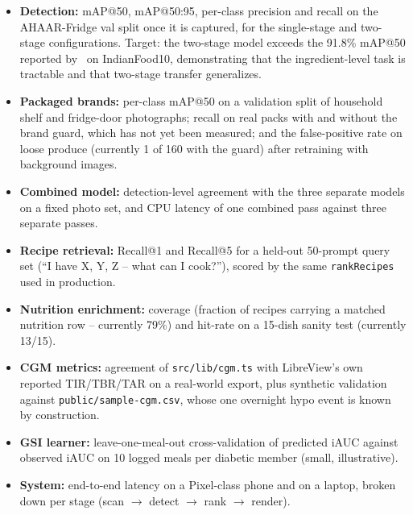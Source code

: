 \documentclass[journal]{IEEEtran}
\begin{document}
\begin{itemize}
  \item \textbf{Detection:} mAP@50, mAP@50:95, per-class precision
        and recall on the AHAAR-Fridge val split once it is captured,
        for the single-stage and two-stage configurations. Target: the two-stage model exceeds the
        91.8\% mAP@50 reported by~\cite{indianfood10} on
        IndianFood10, demonstrating that the ingredient-level task
        is tractable and that two-stage transfer generalizes.
  \item \textbf{Packaged brands:} per-class mAP@50 on a validation
        split of household shelf and fridge-door photographs; recall
        on real packs with and without the brand guard, which has
        not yet been measured; and the false-positive rate on loose
        produce (currently 1 of 160 with the guard) after retraining
        with background images.
  \item \textbf{Combined model:} detection-level agreement with the
        three separate models on a fixed photo set, and CPU latency
        of one combined pass against three separate passes.
  \item \textbf{Recipe retrieval:} Recall@1 and Recall@5 for a
        held-out 50-prompt query set (``I have X, Y, Z -- what
        can I cook?''), scored by the same \texttt{rankRecipes}
        used in production.
  \item \textbf{Nutrition enrichment:} coverage (fraction of recipes
        carrying a matched nutrition row -- currently 79\%) and
        hit-rate on a 15-dish sanity test (currently 13/15).
  \item \textbf{CGM metrics:} agreement of
        \texttt{src/lib/cgm.ts} with LibreView's own reported
        TIR/TBR/TAR on a real-world export, plus synthetic validation
        against \texttt{public/sample-cgm.csv}, whose one overnight
        hypo event is known by construction.
  \item \textbf{GSI learner:} leave-one-meal-out cross-validation
        of predicted iAUC against observed iAUC on 10 logged meals
        per diabetic member (small, illustrative).
  \item \textbf{System:} end-to-end latency on a Pixel-class phone
        and on a laptop, broken down per stage (scan $\rightarrow$
        detect $\rightarrow$ rank $\rightarrow$ render).
\end{itemize}

\end{document}
